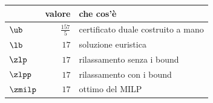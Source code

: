 \begin{center}\small
\begin{tabular}{lrl}
\toprule
 & valore & che cos'è \\
\midrule
$\ub$ & $\frac{157}{5}$ & certificato duale costruito a mano \\
$\lb$ & $17$ & soluzione euristica \\
$\zlp$ & $17$ & rilassamento senza i bound \\
$\zlpp$ & $17$ & rilassamento con i bound \\
$\zmilp$ & $17$ & ottimo del MILP \\
\bottomrule
\end{tabular}
\end{center}
